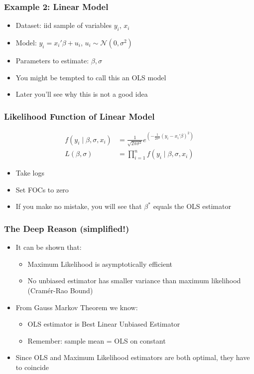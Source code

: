 \documentclass[11pt]{beamer}
\begin{document}
\begin{frame}[c]\frametitle{Example 2: Linear Model}
    \begin{itemize}
        \item Dataset: iid sample of variables $y_i$, $x_i$
        \item Model: $y_i = x_i'\beta + u_i$, $u_i \sim \mathcal{N}(0, \sigma^2)$
        \item Parameters to estimate: $\beta, \sigma$
        \pause
        \item You might be tempted to call this an OLS model
        \item Later you'll see why this is not a good idea
    \end{itemize}
\end{frame}


\begin{frame}[c]\frametitle{Likelihood Function of Linear Model}
    \begin{align*}
        f(y_i \mid \beta, \sigma, x_i) &= \frac{1}{\sqrt{2\pi\sigma^2}} e^{\left(-\frac{1}{2 \sigma^2}(y_i - x_i' \beta)^2\right)} \\
        L(\beta, \sigma) &= \prod_{i = 1}^n f(y_i \mid \beta, \sigma, x_i)
    \end{align*}

    \vspace{1cm}
    \begin{itemize}
        \item Take logs
        \item Set FOCs to zero
        \item If you make no mistake, you will see that $\beta^{*}$ equals the OLS estimator
    \end{itemize}
\end{frame}


\begin{frame}[c]\frametitle{The Deep Reason (simplified!)}
\begin{itemize}
    \item It can be shown that:
    \begin{itemize}
        \item Maximum Likelihood is asymptotically efficient
        \item No unbiased estimator has smaller variance than maximum likelihood (Cramér-Rao Bound)
    \end{itemize}
    \item From Gauss Markov Theorem we know:
    \begin{itemize}
        \item OLS estimator is Best Linear Unbiased Estimator
        \item Remember: sample mean = OLS on constant
    \end{itemize}
    \item Since OLS and Maximum Likelihood estimators are both optimal, they have to coincide
\end{itemize}
\end{frame}
\end{document}
